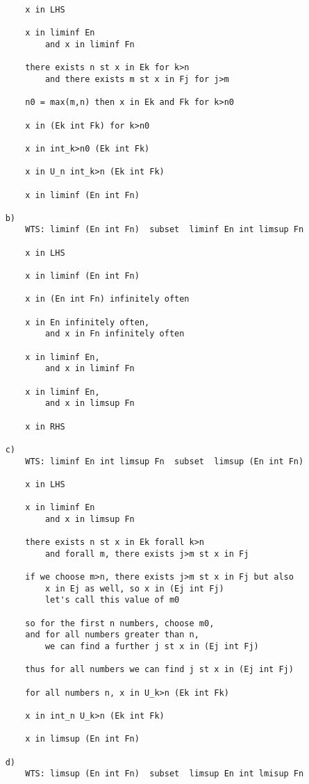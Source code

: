 \documentclass{article}
\begin{document}
\begin{flushleft}
\begin{verbatim}
        x in LHS 

        x in liminf En 
            and x in liminf Fn
    
        there exists n st x in Ek for k>n
            and there exists m st x in Fj for j>m

        n0 = max(m,n) then x in Ek and Fk for k>n0

        x in (Ek int Fk) for k>n0 

        x in int_k>n0 (Ek int Fk)

        x in U_n int_k>n (Ek int Fk)

        x in liminf (En int Fn)

    b)
        WTS: liminf (En int Fn)  subset  liminf En int limsup Fn 

        x in LHS 

        x in liminf (En int Fn)

        x in (En int Fn) infinitely often 

        x in En infinitely often, 
            and x in Fn infinitely often 

        x in liminf En, 
            and x in liminf Fn 

        x in liminf En,
            and x in limsup Fn 

        x in RHS 

    c)
        WTS: liminf En int limsup Fn  subset  limsup (En int Fn)

        x in LHS 

        x in liminf En 
            and x in limsup Fn 

        there exists n st x in Ek forall k>n 
            and forall m, there exists j>m st x in Fj

        if we choose m>n, there exists j>m st x in Fj but also 
            x in Ej as well, so x in (Ej int Fj)
            let's call this value of m0 

        so for the first n numbers, choose m0, 
        and for all numbers greater than n,
            we can find a further j st x in (Ej int Fj)

        thus for all numbers we can find j st x in (Ej int Fj)

        for all numbers n, x in U_k>n (Ek int Fk)

        x in int_n U_k>n (Ek int Fk)

        x in limsup (En int Fn)

    d)
        WTS: limsup (En int Fn)  subset  limsup En int lmisup Fn 


\end{verbatim}
\end{flushleft}
\end{document}
